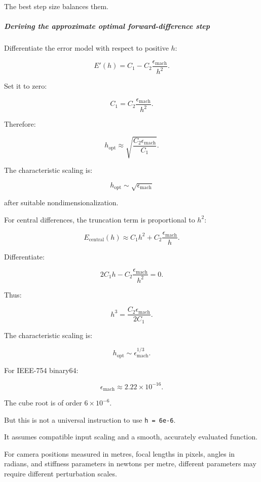 The best step size balances them.

\subparagraph{Deriving the approximate optimal forward-difference step}\label{02-foundations-ii-ch025-deriving-the-approximate-optimal-forward-difference-step}

\hypertarget{02-foundations-ii-ch025-deriving-the-approximate-optimal-forward-difference-step}{}

Differentiate the error model with respect to positive \(h\):

\[
E'(h)= C_1- C_2\frac{\epsilon_{\mathrm{mach}}}{h^2}.
\]

Set it to zero:

\[
C_1= C_2\frac{\epsilon_{\mathrm{mach}}}{h^2}.
\]

Therefore:

\[
\boxed{ h_{\mathrm{opt}} \approx \sqrt{\frac{C_2\epsilon_{\mathrm{mach}}}{C_1}} }.
\]

The characteristic scaling is:

\[
h_{\mathrm{opt}}\sim\sqrt{\epsilon_{\mathrm{mach}}}
\]

after suitable nondimensionalization.

For central differences, the truncation term is proportional to \(h^2\):

\[
E_{\mathrm{central}}(h) \approx C_1h^2+ C_2\frac{\epsilon_{\mathrm{mach}}}{h}.
\]

Differentiate:

\[
2C_1h- C_2\frac{\epsilon_{\mathrm{mach}}}{h^2}=0.
\]

Thus:

\[
h^3= \frac{C_2\epsilon_{\mathrm{mach}}}{2C_1}.
\]

The characteristic scaling is:

\[
\boxed{ h_{\mathrm{opt}}\sim \epsilon_{\mathrm{mach}}^{1/3} }.
\]

For IEEE-754 binary64:

\[
\epsilon_{\mathrm{mach}} \approx2.22\times10^{-16}.
\]

The cube root is of order \(6\times10^{-6}\).

But this is not a universal instruction to use \texttt{h\ =\ 6e-6}.

It assumes compatible input scaling and a smooth, accurately evaluated function.

For camera positions measured in metres, focal lengths in pixels, angles in radians, and stiffness parameters in newtons per metre, different parameters may require different perturbation scales.

